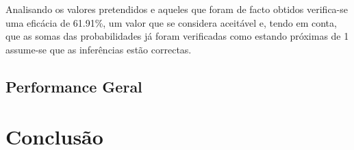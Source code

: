 \documentclass[10pt]{article}
\numberwithin{equation}{section}
\begin{document}
Analisando os valores pretendidos e aqueles que foram de facto obtidos verifica-se uma eficácia de 61.91\%, um valor que se considera aceitável e, tendo em conta, que as somas das probabilidades já foram verificadas como estando próximas de 1 assume-se que as inferências estão correctas.

\subsection{Performance Geral}

\section{Conclusão}
\end{document}
